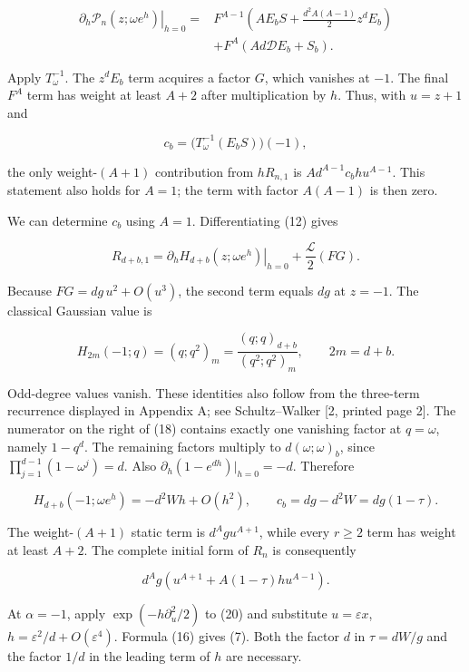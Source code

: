 \documentclass[
  11pt,
]{article}
\begin{document}
\[
\begin{aligned}
\left.\partial_h\mathcal P_n(z;\omega e^h)\right|_{h=0}
={}&F^{A-1}\left(AE_bS+\frac{d^2A(A-1)}2z^dE_b\right)\\
&+F^A\left(Ad\mathcal D E_b+S_b\right).
\end{aligned} \tag{17}
\]

Apply \(T_\omega^{-1}\). The \(z^dE_b\) term acquires a factor \(G\),
which vanishes at \(-1\). The final \(F^A\) term has weight at least
\(A+2\) after multiplication by \(h\). Thus, with \(u=z+1\) and

\[
c_b=\bigl(T_\omega^{-1}(E_bS)\bigr)(-1),
\]

the only weight-\((A+1)\) contribution from \(hR_{n,1}\) is
\(Ad^{A-1}c_bhu^{A-1}\). This statement also holds for \(A=1\); the term
with factor \(A(A-1)\) is then zero.

We can determine \(c_b\) using \(A=1\). Differentiating (12) gives

\[
R_{d+b,1}=\left.\partial_hH_{d+b}(z;\omega e^h)\right|_{h=0}
+\frac{\mathcal L}{2}(FG).
\]

Because \(FG=dg\,u^2+O(u^3)\), the second term equals \(dg\) at
\(z=-1\). The classical Gaussian value is

\[
H_{2m}(-1;q)=(q;q^2)_m
=\frac{(q;q)_{d+b}}{(q^2;q^2)_m},\qquad 2m=d+b. \tag{18}
\]

Odd-degree values vanish. These identities also follow from the
three-term recurrence displayed in Appendix A; see Schultz--Walker {[}2,
printed page 2{]}. The numerator on the right of (18) contains exactly
one vanishing factor at \(q=\omega\), namely \(1-q^d\). The remaining
factors multiply to \(d(\omega;\omega)_b\), since
\(\prod_{j=1}^{d-1}(1-\omega^j)=d\). Also
\(\partial_h(1-e^{dh})|_{h=0}=-d\). Therefore

\[
H_{d+b}(-1;\omega e^h)=-d^2Wh+O(h^2),
\qquad c_b=dg-d^2W=dg(1-\tau). \tag{19}
\]

The weight-\((A+1)\) static term is \(d^Agu^{A+1}\), while every
\(r\geq2\) term has weight at least \(A+2\). The complete initial form
of \(R_n\) is consequently

\[
d^Ag\left(u^{A+1}+A(1-\tau)hu^{A-1}\right). \tag{20}
\]

At \(\alpha=-1\), apply \(\exp(-h\partial_u^2/2)\) to (20) and
substitute \(u=\varepsilon x\), \(h=\varepsilon^2/d+O(\varepsilon^4)\).
Formula (16) gives (7). Both the factor \(d\) in \(\tau=dW/g\) and the
factor \(1/d\) in the leading term of \(h\) are necessary.
\end{document}
